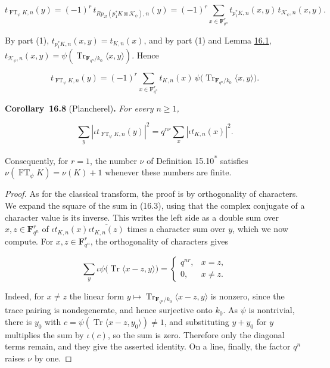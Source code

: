\documentclass[11pt]{article}
\newenvironment{bpstatement}[2]{\par\addvspace{0.6\baselineskip}\noindent\textbf{#1}#2\textbf{.}\enspace\ignorespaces}
  {\par\addvspace{0.4\baselineskip}}
\newenvironment{bpstatementit}[2]{\begin{bpstatement}{#1}{#2}\itshape\ignorespaces}{\end{bpstatement}}
\newcommand{\bpout}[1]{#1\textsuperscript{\hyperlink{bp-outside}{\ensuremath{\ast}}}}
\begin{document}
\[
t_{\operatorname{FT}_\psi K,n}(y)
=(-1)^r\,t_{Rp_{2!}(p_1^*K\otimes\mathcal K_\psi),n}(y)
=(-1)^r\sum_{x\in\mathbf F_{q^n}^r}t_{p_1^*K,n}(x,y)\,
t_{\mathcal K_\psi,n}(x,y).
\]

By part (1), \(t_{p_1^*K,n}(x,y)=t_{K,n}(x)\), and by part (1) and Lemma \hyperref[bp5]{16.1}, \(t_{\mathcal K_\psi,n}(x,y)=\psi(\operatorname{Tr}_{\mathbf F_{q^n}/k_0}\langle x,y\rangle)\). Hence

\[
t_{\operatorname{FT}_\psi K,n}(y)
=(-1)^r\sum_{x\in\mathbf F_{q^n}^r}
t_{K,n}(x)\,
\psi\bigl(\operatorname{Tr}_{\mathbf F_{q^n}/k_0}
\langle x,y\rangle\bigr).
\tag{16.3}
\]

\label{bp26}%
\begin{bpstatementit}{Corollary~16.8}{ (Plancherel)}
For every \(n\ge1\),

\[
\sum_y|\iota t_{\operatorname{FT}_\psi K,n}(y)|^2
=q^{nr}\sum_x|\iota t_{K,n}(x)|^2.
\]

Consequently, for \(r=1\), the number \(\nu\) of Definition \bpout{15.10} satisfies \(\nu(\operatorname{FT}_\psi K)=\nu(K)+1\) whenever these numbers are finite.
\end{bpstatementit}

\begin{proof}[{Proof}]\label{bp27}%
As for the classical transform, the proof is by orthogonality of characters. We expand the square of the sum in (16.3), using that the complex conjugate of a character value is its inverse. This writes the left side as a double sum over \(x,z\in\mathbf F_{q^n}^r\) of \(\iota t_{K,n}(x)\overline{\iota t_{K,n}(z)}\) times a character sum over \(y\), which we now compute. For \(x,z\in\mathbf F_{q^n}^r\), the orthogonality of characters gives

\[
\sum_y\iota\psi\bigl(\operatorname{Tr}\langle x-z,y\rangle\bigr)
=\begin{cases}q^{nr},&x=z,\\0,&x\ne z.\end{cases}
\]

Indeed, for \(x\ne z\) the linear form \(y\mapsto\operatorname{Tr}_{\mathbf F_{q^n}/k_0}\langle x-z,y\rangle\) is nonzero, since the trace pairing is nondegenerate, and hence surjective onto \(k_0\). As \(\psi\) is nontrivial, there is \(y_0\) with \(c=\psi(\operatorname{Tr}\langle x-z,y_0\rangle)\ne1\), and substituting \(y+y_0\) for \(y\) multiplies the sum by \(\iota(c)\), so the sum is zero. Therefore only the diagonal terms remain, and they give the asserted identity. On a line, finally, the factor \(q^n\) raises \(\nu\) by one.
\end{proof}
\end{document}
